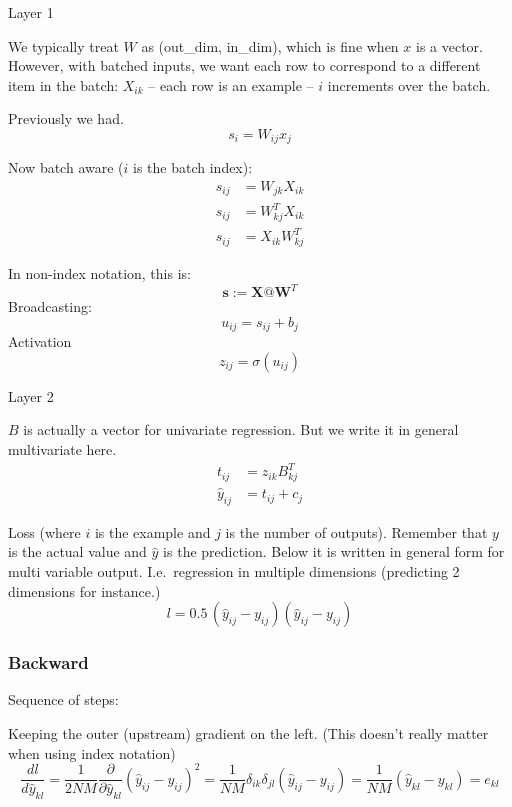 \documentclass[11pt]{article}
\newcommand{\pd}[2]{\frac{\partial #1}{\partial #2}}
\begin{document}
Layer 1

We typically treat $W$ as (out\_dim, in\_dim), which is fine when $x$ is a
vector. However, with batched inputs, we want each row to correspond to a
different item in the batch: $X_{ik}$ -- each row is an example -- $i$
increments over the batch.

Previously we had.
\begin{equation*}
s_{i} = W_{ij} x_j
\end{equation*}

Now batch aware ($i$ is the batch index):
\begin{align*}
  s_{ij} &=  W_{jk} X_{ik} \\
  s_{ij} &=  W^T_{kj} X_{ik} \\
  s_{ij} &=  X_{ik} W^T_{kj}
\end{align*}

In non-index notation, this is:
\begin{equation*}
  \mathbf{s}  := \mathbf{X} @ \mathbf{W}^T
\end{equation*}
Broadcasting:
\begin{equation*}
u_{ij} = s_{ij} + b_{j}
\end{equation*}
Activation
\[
z_{ij} = \sigma(u_{ij})
\]

Layer 2

$B$ is actually a vector for univariate regression. But we write it in general
multivariate here.
\begin{align*}
t_{ij} &= z_{ik} B^T_{kj} \\
\hat{y}_{ij} &= t_{ij} + c_j
\end{align*}

Loss (where $i$ is the example and $j$ is the number of outputs). Remember that
$y$ is the actual value and $\hat{y}$ is the prediction. Below it is written in
general form for multi variable output. I.e.\ regression in multiple dimensions
(predicting 2 dimensions for instance.)
\[
l = 0.5\,(\hat{y}_{ij} - y_{ij})(\hat{y}_{ij} - y_{ij})
\]

\subsubsection*{Backward}
Sequence of steps:

Keeping the outer (upstream) gradient on the left. (This doesn't really matter
when using index notation)
\[
\frac{dl}{d\hat{y}_{kl}} = \frac{1}{2NM} \pd{}{\hat{y}_{kl}}(\hat{y}_{ij} - y_{ij})^2 = \frac{1}{NM} \delta_{ik}\delta_{jl} (\hat{y}_{ij} - y_{ij}) = \frac{1}{NM}(\hat{y}_{kl} - y_{kl}) = e_{kl}
\]
\end{document}
